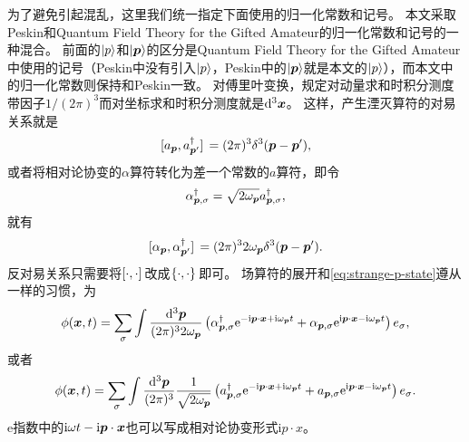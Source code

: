 \documentclass[hyperref, UTF8, a4paper]{ctexart}
\newcommand*{\ii}{\mathrm{i}}
\newcommand*{\ee}{\mathrm{e}}
\begin{document}
为了避免引起混乱，这里我们统一指定下面使用的归一化常数和记号。
本文采取Peskin和Quantum Field Theory for the Gifted Amateur的归一化常数和记号的一种混合。
前面的$\ket{p}$和$\ket{\vb*{p}}$的区分是Quantum Field Theory for the Gifted Amateur中使用的记号（Peskin中没有引入$\ket{p}$，Peskin中的$\ket{\vb*{p}}$就是本文的$\ket{p}$），而本文中的归一化常数则保持和Peskin一致。
对傅里叶变换，规定对动量求和时积分测度带因子$1/(2\pi)^3$而对坐标求和时积分测度就是$\dd[3]{\vb*{x}}$。
这样，产生湮灭算符的对易关系就是
\begin{equation}
    \comm*{{a}_{\vb*{p}}}{{a}^\dagger_{\vb*{p}'}} = (2\pi)^3 \delta^3 (\vb*{p} - \vb*{p}'),
\end{equation}
或者将相对论协变的$\alpha$算符转化为差一个常数的$a$算符，即令
\begin{equation}
    \alpha^\dagger_{\vb*{p}, \sigma} = \sqrt{2 \omega_{\vb*{p}}} a^\dagger_{\vb*{p}, \sigma},
\end{equation}
就有
\begin{equation}
    \comm*{{\alpha}_{\vb*{p}}}{{\alpha}^\dagger_{\vb*{p}'}} = (2\pi)^3 2 \omega_{\vb*{p}} \delta^3 (\vb*{p} - \vb*{p}').
\end{equation}
反对易关系只需要将$\comm*{\cdot}{\cdot}$改成$\acomm*{\cdot}{\cdot}$即可。
场算符的展开和\eqref{eq:strange-p-state}遵从一样的习惯，为
\begin{equation}
    \phi(\vb*{x}, t) = \sum_{\sigma} \int \frac{\dd[3]{\vb*{p}}}{(2\pi)^3 2 \omega_{\vb*{p}}} \left( {\alpha}^\dagger_{\vb*{p}, \sigma} \ee^{- \ii \vb*{p} \cdot \vb*{x} + \ii \omega_{\vb*{p}} t} + {\alpha}_{\vb*{p}, \sigma} \ee^{\ii \vb*{p} \cdot \vb*{x} - \ii \omega_{\vb*{p}} t} \right) e_\sigma,
\end{equation}
或者
\begin{equation}
    {\phi}(\vb*{x}, t) = \sum_\sigma \int \frac{\dd[3]{\vb*{p}}}{(2\pi)^3} \frac{1}{\sqrt{2 \omega_{\vb*{p}}}} \left( {a}^\dagger_{\vb*{p}, \sigma} \ee^{- \ii \vb*{p} \cdot \vb*{x} + \ii \omega_{\vb*{p}} t} + {a}_{\vb*{p}, \sigma} \ee^{\ii \vb*{p} \cdot \vb*{x} - \ii \omega_{\vb*{p}} t} \right) e_\sigma. 
    \label{eq:field-operator-fourier}
\end{equation}
$\ee$指数中的$\ii \omega t - \ii \vb*{p} \cdot \vb*{x}$也可以写成相对论协变形式$\ii p \cdot x$。
\end{document}
